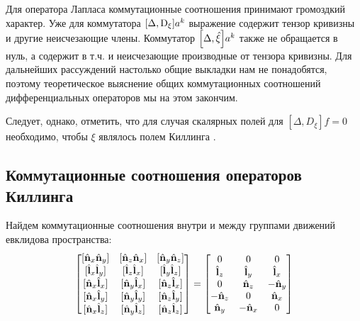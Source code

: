 \documentclass[12pt,a4paper]{article}
\begin{document}
                Для оператора Лапласа коммутационные соотношения принимают громоздкий характер. Уже для коммутатора $\comm{\Delta}{\D_\xi} a^k$ выражение содержит тензор кривизны и другие неисчезающие члены. Коммутатор $\comm{\Delta}{\Op{\xi}} a^k$ также не обращается в нуль, а содержит в т.ч. и неисчезающие производные от тензора кривизны. Для дальнейших рассуждений настолько общие выкладки нам не понадобятся, поэтому теоретическое выяснение общих коммутационных соотношений дифференциальных операторов мы на этом закончим.

                Следует, однако, отметить, что для случая скалярных полей для $[\Delta, D_\xi] f = 0$ необходимо, чтобы $\xi$ являлось полем Киллинга \cite{differential_operator_commutators}.


        \subsection{Коммутационные соотношения операторов Киллинга}

            Найдем коммутационные соотношения внутри и между группами движений евклидова пространства:
            \begin{equation}
                \begin{bmatrix}
                    [ \Op{n}_x \Op{n}_y ] & [ \Op{n}_z \Op{n}_x ] & [ \Op{n}_y \Op{n}_z ] \\
                    [ \Op{l}_x \Op{l}_y ] & [ \Op{l}_z \Op{l}_x ] & [ \Op{l}_y \Op{l}_z ] \\
                    [ \Op{n}_x \Op{l}_x ] & [ \Op{n}_y \Op{l}_x ] & [ \Op{n}_z \Op{l}_x ] \\
                    [ \Op{n}_x \Op{l}_y ] & [ \Op{n}_y \Op{l}_y ] & [ \Op{n}_z \Op{l}_y ] \\
                    [ \Op{n}_x \Op{l}_z ] & [ \Op{n}_y \Op{l}_z ] & [ \Op{n}_z \Op{l}_z ]
                \end{bmatrix}
                =
                \begin{bmatrix}
                    0          &   0        &   0        \\
                    \Op{l}_z &   \Op{l}_y &   \Op{l}_x \\
                    0          &   \Op{n}_z & - \Op{n}_y \\
                    - \Op{n}_z &   0        &   \Op{n}_x \\
                    \Op{n}_y & - \Op{n}_x &   0
                \end{bmatrix}
            \end{equation}
\end{document}
